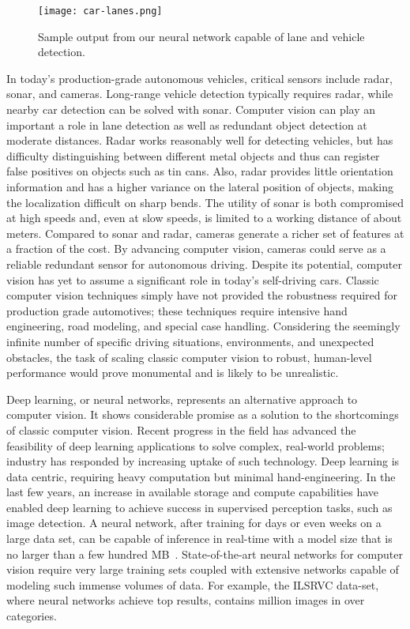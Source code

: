 \documentclass[journal]{IEEEtran}
\begin{document}
\begin{figure}[t]
  \centering
    \texttt{[image: car-lanes.png]}
 \caption{Sample output from our neural network capable of lane and vehicle detection.}
 \label{fig:car-lanes}
\end{figure}
In today's production-grade autonomous vehicles, critical sensors include radar, sonar, and cameras. Long-range vehicle detection typically requires radar, while nearby car detection can be solved with sonar. Computer vision can play an important a role in lane detection as well as redundant object detection at moderate distances. Radar works reasonably well for detecting vehicles, but has difficulty distinguishing between different metal objects and thus can register false positives on objects such as tin cans. Also, radar provides little orientation information and has a higher variance on the lateral position of objects, making the localization difficult on sharp bends. The utility of sonar is both compromised at high speeds and, even at slow speeds, is limited to a working distance of about  meters. Compared to sonar and radar, cameras generate a richer set of features at a fraction of the cost. By advancing computer vision, cameras could serve as a reliable redundant sensor for autonomous driving. Despite its potential, computer vision has yet to assume a significant role in today's self-driving cars. Classic computer vision techniques simply have not provided the robustness required for production grade automotives; these techniques require intensive hand engineering, road modeling, and special case handling. Considering the seemingly infinite number of specific driving situations, environments, and unexpected obstacles, the task of scaling classic computer vision to robust, human-level performance would prove monumental and is likely to be unrealistic.

Deep learning, or neural networks, represents an alternative approach to computer vision. It shows considerable promise as a solution to the shortcomings of classic computer vision. Recent progress in the field has advanced the feasibility of deep learning applications to solve complex, real-world  problems; industry has responded by increasing uptake of such technology. Deep learning is data centric, requiring heavy computation but minimal hand-engineering. In the last few years, an increase in available storage and compute capabilities have enabled deep learning to achieve success in supervised perception tasks, such as image detection. A neural network, after training for days or even weeks on a large data set, can be capable of inference in real-time with a model size that is no larger than a few hundred MB~\cite{krizhevsky-2012}. State-of-the-art neural networks for computer vision require very large training sets coupled with extensive networks capable of modeling such immense volumes of data. For example, the ILSRVC data-set, where neural networks achieve top results, contains  million images in over  categories. 
\end{document}
